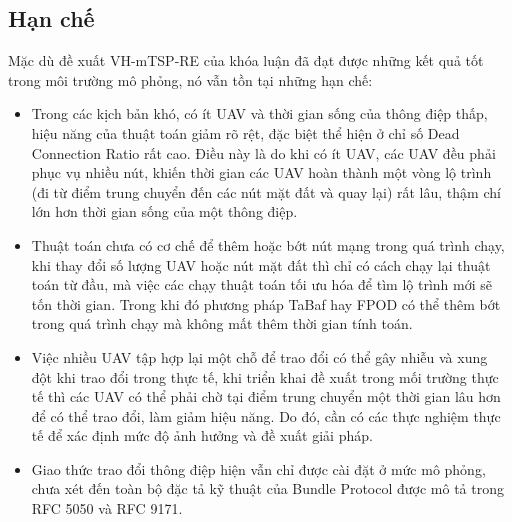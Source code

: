 \documentclass[a4paper]{article}
\begin{document}
\subsection{Hạn chế}
Mặc dù đề xuất VH-mTSP-RE của khóa luận đã đạt được những kết quả tốt trong môi trường mô phỏng, nó vẫn tồn tại những hạn chế:
\begin{itemize}
  \item Trong các kịch bản khó, có ít UAV và thời gian sống của thông điệp thấp, hiệu năng của thuật toán giảm rõ rệt, đặc biệt thể hiện ở chỉ số Dead Connection Ratio rất cao. Điều này là do khi có ít UAV, các UAV đều phải phục vụ nhiều nút, khiến thời gian các UAV hoàn thành một vòng lộ trình (đi từ điểm trung chuyển đến các nút mặt đất và quay lại) rất lâu, thậm chí lớn hơn thời gian sống của một thông điệp.
  \item Thuật toán chưa có cơ chế để thêm hoặc bớt nút mạng trong quá trình chạy, khi thay đổi số lượng UAV hoặc nút mặt đất thì chỉ có cách chạy lại thuật toán từ đầu, mà việc các chạy thuật toán tối ưu hóa để tìm lộ trình mới sẽ tốn thời gian. Trong khi đó phương pháp TaBaf hay FPOD có thể thêm bớt trong quá trình chạy mà không mất thêm thời gian tính toán.
  \item Việc nhiều UAV tập hợp lại một chỗ để trao đổi có thể gây nhiễu và xung đột khi trao đổi trong thực tế, khi triển khai đề xuất trong mối trường thực tế thì các UAV có thể phải chờ tại điểm trung chuyển một thời gian lâu hơn để có thể trao đổi, làm giảm hiệu năng. Do đó, cần có các thực nghiệm thực tế để xác định mức độ ảnh hưởng và đề xuất giải pháp.
  \item Giao thức trao đổi thông điệp hiện vẫn chỉ được cài đặt ở mức mô phỏng, chưa xét đến toàn bộ đặc tả kỹ thuật của Bundle Protocol được mô tả trong RFC 5050 và RFC 9171.
\end{itemize}
\end{document}

